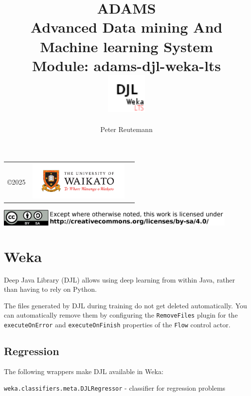 \documentclass[a4paper]{book}
\title{
  \textbf{ADAMS} \\
  {\Large \textbf{A}dvanced \textbf{D}ata mining \textbf{A}nd \textbf{M}achine
  learning \textbf{S}ystem} \\
  {\Large Module: adams-djl-weka-lts} \\
  \vspace{1cm}
  \includegraphics[width=2cm]{images/djl-weka-lts-module.png} \\
}
\author{
  Peter Reutemann
}
\begin{document}
\begin{titlepage}
\maketitle

\thispagestyle{empty}
\center
\begin{table}[b]
	\begin{tabular}{c l l}
		\parbox[c][2cm]{2cm}{\copyright 2025} &
		\parbox[c][2cm]{5cm}{\includegraphics[width=5cm]{images/coat_of_arms.pdf}} \\
	\end{tabular}
	\includegraphics[width=12cm]{images/cc.png} \\
\end{table}

\end{titlepage}

\tableofcontents

\chapter{Weka}
Deep Java Library (DJL)\cite{djl} allows using deep learning from within Java, rather than having to rely on Python.

The files generated by DJL during training do not get deleted automatically. You can
automatically remove them by configuring the \texttt{RemoveFiles} plugin for the \texttt{executeOnError} and
\texttt{executeOnFinish} properties of the \texttt{Flow} control actor.

\section{Regression}
The following wrappers make DJL available in Weka\cite{weka}:
\begin{tight_itemize}
    \item \texttt{weka.classifiers.meta.DJLRegressor} - classifier for regression problems
\end{tight_itemize}


\end{document}
